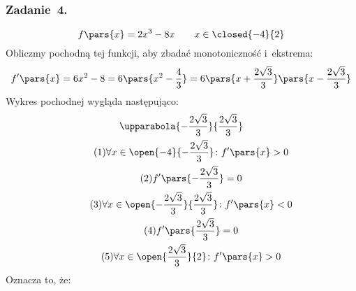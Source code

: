 \subsubsection{Zadanie~4.}
\begin{equation*}
    f\pars{x}
        = 2x^3 - 8x \qquad x \in \closed{-4}{2}
\end{equation*}
Obliczmy pochodną tej funkcji, aby zbadać monotoniczność i~ekstrema:
\begin{equation*}
    f'\pars{x}
        = 6x^2 - 8
        = 6\pars{x^2 - \frac{4}{3}}
        = 6\pars{x + \frac{2\sqrt{3}}{3}}\pars{x - \frac{2\sqrt{3}}{3}}
\end{equation*}
Wykres pochodnej wygląda następująco:
\begin{gather*}
    \upparabola{-\frac{2\sqrt{3}}{3}}{\frac{2\sqrt{3}}{3}}\\
    \tag{\(1\)} \forall x \in \open{-4}{-\frac{2\sqrt{3}}{3}}\colon f'\pars{x} > 0 \label{2020_11_17:4:first_increase}\\
    \tag{\(2\)} f'\pars{-\frac{2\sqrt{3}}{3}} = 0 \label{2020_11_17:4:first_zero}\\
    \tag{\(3\)} \forall x \in \open{-\frac{2\sqrt{3}}{3}}{\frac{2\sqrt{3}}{3}}\colon f'\pars{x} < 0 \label{2020_11_17:4:decrease}\\
    \tag{\(4\)} f'\pars{\frac{2\sqrt{3}}{3}} = 0 \label{2020_11_17:4:second_zero}\\
    \tag{\(5\)} \forall x \in \open{\frac{2\sqrt{3}}{3}}{2}\colon f'\pars{x} > 0 \label{2020_11_17:4:second_increase}
\end{gather*}
Oznacza to, że:
